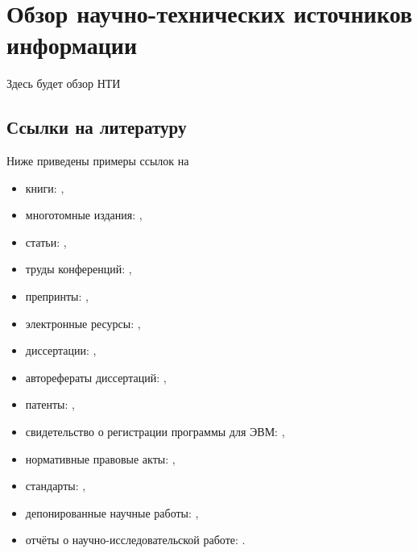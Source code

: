 \renewcommand{\chaptertitle}{Обзор научно-технических источников информации}  %
\chapter{\chaptertitle}\label{ch:ch1}

Здесь будет обзор НТИ

\section{Ссылки на литературу}\label{sec:ch1/sec3}

Ниже приведены примеры ссылок на 
\begin{itemize}
  \item книги: \cite{Sychev,Sokolov,Gaidaenko},
  \item многотомные издания: \cite{Lermontov,Russell},

  \item статьи: \cite{Berestova,Janiesch},
  \item труды конференций: \cite{Conference},
  \item препринты: \cite{arXiv,arXiv2},

  \item электронные ресурсы: \cite{Encyclopedia,Nasirova},
  \item диссертации: \cite{Lagkueva,Pokrovski,Belozerov},
  \item авторефераты диссертаций: \cite{Sirotko,Lukina},
  \item патенты: \cite{patent2,patent3,patbib1},
  \item свидетельство о регистрации программы для ЭВМ: \cite{progbib1},
  \item нормативные правовые акты: \cite{Constitution,FamilyCode},
  \item стандарты: \cite{Gost.7.0.53,standard3},
  \item депонированные научные работы: \cite{Razumovski},
  \item отчёты о научно-исследовательской работе: \cite{Methodology}.
\end{itemize}